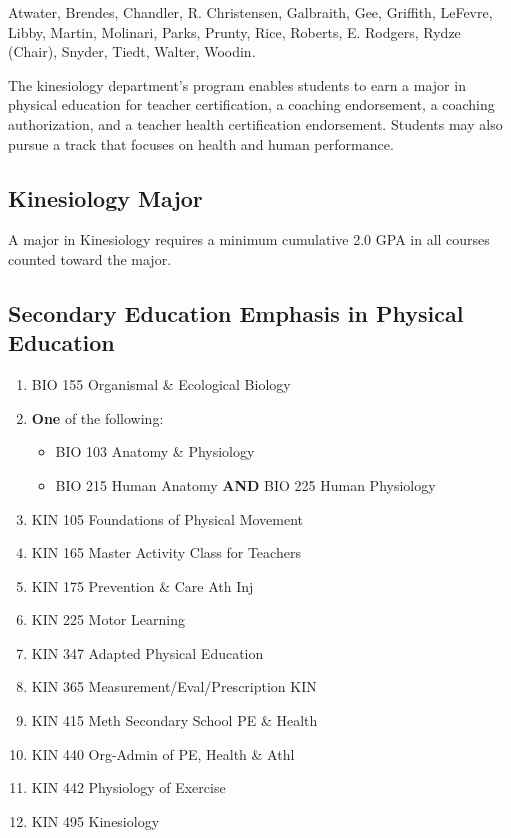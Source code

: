 \documentclass[
  letterpaper,
]{scrbook}
\providecommand{\tightlist}{%
  \setlength{\itemsep}{0pt}\setlength{\parskip}{0pt}}
\begin{document}
Atwater, Brendes, Chandler, R. Christensen, Galbraith, Gee, Griffith,
LeFevre, Libby, Martin, Molinari, Parks, Prunty, Rice, Roberts, E.
Rodgers, Rydze (Chair), Snyder, Tiedt, Walter, Woodin.

The kinesiology department's program enables students to earn a major in
physical education for teacher certification, a coaching endorsement, a
coaching authorization, and a teacher health certification endorsement.
Students may also pursue a track that focuses on health and human
performance.

\subsection{Kinesiology Major}\label{kinesiology-major}

A major in Kinesiology requires a minimum cumulative 2.0 GPA in all
courses counted toward the major.

\subsection{Secondary Education Emphasis in Physical
Education}\label{secondary-education-emphasis-in-physical-education}

\begin{enumerate}
\def\labelenumi{\arabic{enumi}.}
\tightlist
\item
  BIO 155 Organismal \& Ecological Biology
\item
  \textbf{One} of the following:

  \begin{itemize}
  \tightlist
  \item
    BIO 103 Anatomy \& Physiology
  \item
    BIO 215 Human Anatomy \textbf{AND} BIO 225 Human Physiology
  \end{itemize}
\item
  KIN 105 Foundations of Physical Movement
\item
  KIN 165 Master Activity Class for Teachers
\item
  KIN 175 Prevention \& Care Ath Inj
\item
  KIN 225 Motor Learning
\item
  KIN 347 Adapted Physical Education
\item
  KIN 365 Measurement/Eval/Prescription KIN
\item
  KIN 415 Meth Secondary School PE \& Health
\item
  KIN 440 Org-Admin of PE, Health \& Athl
\item
  KIN 442 Physiology of Exercise
\item
  KIN 495 Kinesiology
\end{enumerate}
\end{document}
